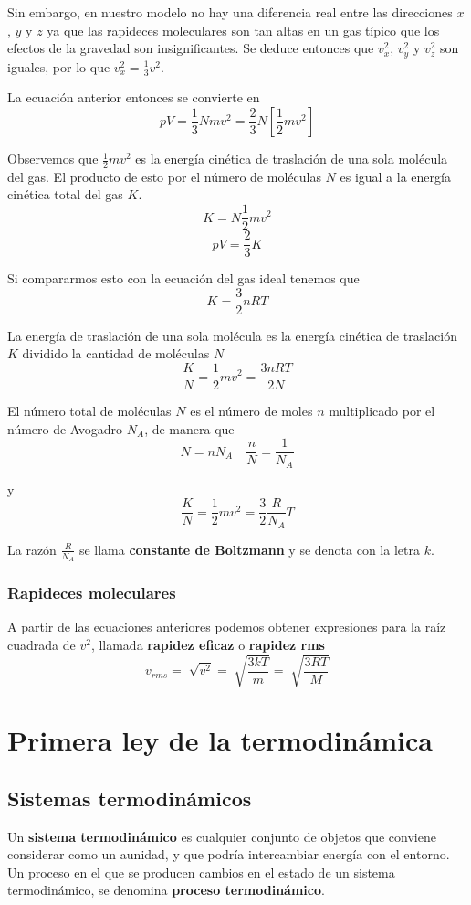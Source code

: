 \documentclass[12pt]{article}
\begin{document}
  Sin embargo, en nuestro modelo no hay una diferencia real entre las direcciones $ x $, $ y $ y $ z $ ya que las rapideces moleculares son tan altas en un gas típico que los efectos de la gravedad son insignificantes. Se deduce entonces que $ v_{x}^{2} $, $ v_{y}^{2} $ y $ v_{z}^{2} $ son iguales, por lo que $ v_{x}^{2} = \frac{1}{3}v^{2} $.

  La ecuación anterior entonces se convierte en 
  \[
  pV = \frac{1}{3}Nmv^{2} = \frac{2}{3}N\left[\frac{1}{2}mv^{2}\right]
  \]

  Observemos que $ \frac{1}{2}mv^{2} $ es la energía cinética de traslación de una sola molécula del gas. El producto de esto por el número de moléculas $ N $ es igual a la energía cinética total del gas $ K $. 
  \[
  K = N\frac{1}{2}mv^{2}
  \]
  \[
    pV = \frac{2}{3}K
  \]

  Si compararmos esto con la ecuación del gas ideal tenemos que 
  \[
  K = \frac{3}{2}nRT
  \]

  La energía de traslación de una sola molécula es la energía cinética de traslación $ K $ dividido la cantidad de moléculas $ N $
  \[
  \frac{K}{N} = \frac{1}{2}mv^{2} = \frac{3nRT}{2N}
  \]

  El número total de moléculas $ N $ es el número de moles $ n $ multiplicado por el número de Avogadro $ N_{A} $, de manera que
  \[
    N = nN_{A} \quad \frac{n}{N} = \frac{1}{N_{A}}
  \]

  y
  \[
  \frac{K}{N} = \frac{1}{2}mv^{2} = \frac{3}{2}\frac{R}{N_{A}}T
  \]

  La razón $ \frac{R}{N_{A}} $ se llama \textbf{constante de Boltzmann} y se denota con la letra $ k $.

  \subsubsection{Rapideces moleculares}
  A partir de las ecuaciones anteriores podemos obtener expresiones para la raíz cuadrada de $ v^{2} $, llamada \textbf{rapidez eficaz} o \textbf{rapidez rms}
  \[
    v_{rms} = \sqrt[]{v^{2}} = \sqrt[]{\frac{3kT}{m}} = \sqrt[]{\frac{3RT}{M}}
  \]

  \section{Primera ley de la termodinámica}
  \subsection{Sistemas termodinámicos}
  Un \textbf{sistema termodinámico} es cualquier conjunto de objetos que conviene considerar como un aunidad, y que podría intercambiar energía con el entorno. Un proceso en el que se producen cambios en el estado de un sistema termodinámico, se denomina \textbf{proceso termodinámico}.
\end{document}
